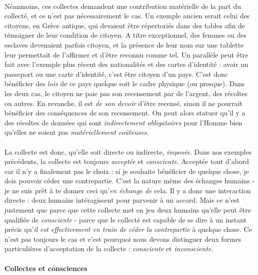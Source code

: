 \paragraph{} Néanmoins, ces collectes demandent une contribution matérielle de la part du collecté, et ce n'est pas
nécessairement le cas. Un exemple ancien serait celui des citoyens, en Grèce antique, qui devaient être répertoriés
dans des tables afin de témoigner de leur condition de citoyen. A titre exceptionnel, des femmes ou des esclaves
devenaient parfois citoyen, et la présence de leur nom sur une tablette leur permettait de l'affirmer et d'être
reconnu comme tel. Un parallèle peut être fait avec l'exemple plus récent des nationalités et des cartes d'identité :
avoir un passeport ou une carte d'identité, c'est être citoyen d'un pays. C'est donc bénéficier des \emph{lois} de ce
pays quelque soit le cadre physique (ou presque). Dans les deux cas, le citoyen ne paie pas son recensement par de l'argent,
des récoltes ou autres. En revanche, il est \emph{de son devoir} d'être recensé, sinon il ne pourrait bénéficier des 
conséquences de son recensement. On peut alors statuer qu'il y a des récoltes de données qui sont \emph{indirectement
obligatoires} pour l'Homme bien qu'elles ne soient pas \emph{matériellement coûteuses}.

\paragraph{} La collecte est donc, qu'elle soit directe ou indirecte, \emph{imposée}. Dans nos exemples précédents,
la collecte est toujours \emph{acceptée} et \emph{consciente}. Acceptée tout d'abord car il n'y a finalement pas le
choix : si je souhaite bénéficier de quelque chose, je dois pouvoir céder une contrepartie. C'est la nature même des
échanges humains - je ne suis prêt à te donner ceci qu'\emph{en échange de} cela. Il y a donc une interaction directe 
: deux humains intéragissent pour parvenir à un accord. Mais ce n'est justement que parce que cette collecte met en
jeu deux humains qu'elle peut être qualifiée de \emph{consciente} - parce que le collecté est capable de se dire à
un instant précis qu'\emph{il est effectivement en train de céder la contrepartie} à quelque chose. Ce n'est pas
toujours le cas et c'est pourquoi nous devons distinguer deux formes particulières d'acceptation de la collecte :
\emph{consciente} et \emph{inconsciente}.   

\paragraph{Collectes et consciences} \label{collect_data_conscious}

